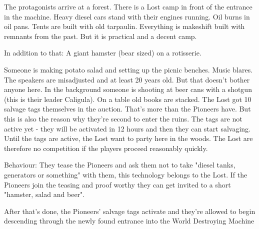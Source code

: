 The protagonists arrive at a forest. There is a Lost camp in front of the entrance in the machine. Heavy diesel cars stand with their engines running. Oil burns in oil pans. Tents are built with old tarpaulin. Everything is makeshift built with remnants from the past. But it is practical and a decent camp.

In addition to that: A giant hamster (bear sized) on a rotisserie.

Someone is making potato salad and setting up the picnic benches. Music blares.
The speakers are misadjusted and at least 20 years old. But that doesn't bother anyone here. In the background someone is shooting at beer cans with a shotgun (this is their leader Caligula). On a table old books are stacked.
The Lost got 10 salvage tags themselves in the auction. That's more than the Pioneers have. But this is also the reason why they're second to enter the ruins. The tags are not active yet - they will be activated in 12 hours and then they can start salvaging. Until the tags are active, the Lost want to party
here in the woods. The Lost are therefore no competition if the players proceed reasonably quickly.

Behaviour: They tease the Pioneers and ask them not to take "diesel tanks, generators or something" with
them, this technology belongs to the Lost. If the Pioneers join the teasing and proof worthy they can get invited to a short "hamster, salad and beer".

After that's done, the Pioneers' salvage tags activate and they're allowed to begin descending through the newly found entrance into the World Destroying Machine

